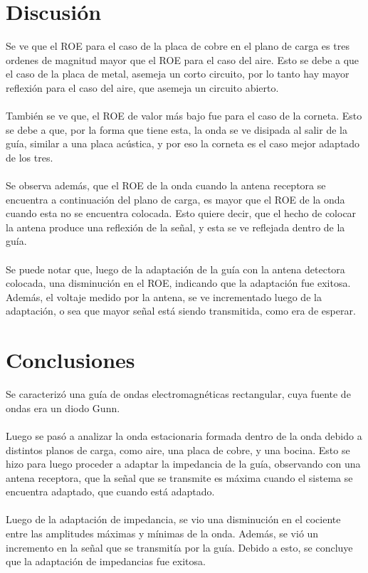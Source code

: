 \documentclass[11pt,a4paper]{article}
\begin{document}
\begin{multicols}{2}
\section{Discusión}
Se ve que el ROE para el caso de la placa de cobre en el plano de carga es tres ordenes de magnitud mayor que el ROE para el caso del aire. Esto se debe a que el caso de la placa de metal, asemeja un corto circuito, por lo tanto hay mayor reflexión para el caso del aire, que asemeja un circuito abierto. \\ \\
También se ve que, el ROE de valor más bajo fue para el caso de la corneta. Esto se debe a que, por la forma que tiene esta, la onda se ve disipada al salir de la guía, similar a una placa acústica, y por eso la corneta es el caso mejor adaptado de los tres. \\ \\
Se observa además, que el ROE de la onda cuando la antena receptora se encuentra a continuación del plano de carga, es mayor que el ROE de la onda cuando esta no se encuentra colocada. Esto quiere decir, que el hecho de colocar la antena produce una reflexión de la señal, y esta se ve reflejada dentro de la guía. \\ \\
Se puede notar que, luego de la adaptación de la guía con la antena detectora colocada, una disminución en el ROE, indicando que la adaptación fue exitosa. Además, el voltaje medido por la antena, se ve incrementado luego de la adaptación, o sea que mayor señal está siendo transmitida, como era de esperar.
\section{Conclusiones}

Se caracterizó una guía de ondas electromagnéticas rectangular, cuya fuente de ondas era un diodo Gunn.\\ \\
Luego se pasó a analizar la onda estacionaria formada dentro de la onda debido a distintos planos de carga, como aire, una placa de cobre, y una bocina. Esto se hizo para luego proceder a adaptar la impedancia de la guía, observando con una antena receptora, que la señal que se transmite es máxima cuando el sistema se encuentra adaptado, que cuando está adaptado. \\ \\
Luego de la adaptación de impedancia, se vio una disminución en el cociente entre las amplitudes máximas y mínimas de la onda. Además, se vió un incremento en la señal que se transmitía por la guía. Debido a esto, se concluye que la adaptación de impedancias fue exitosa. \\ \\





\end{multicols}
\end{document}
